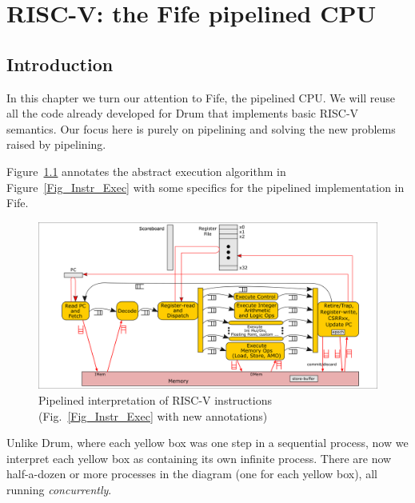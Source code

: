 

\chapter{RISC-V: the Fife pipelined CPU}


\setcounter{page}{1}
\renewcommand{\thepage}{\arabic{chapter}-\arabic{page}}

\label{ch_Fife_Pending}


\section{Introduction}

In this chapter we turn our attention to Fife, the pipelined CPU.  We
will reuse all the code already developed for Drum that implements
basic RISC-V semantics.  Our focus here is purely on pipelining and
solving the new problems raised by pipelining.

Figure~\ref{Fig_Instr_Exec_w_FIFOs} annotates the abstract execution
algorithm in Figure~\ref{Fig_Instr_Exec} with some specifics for the
pipelined implementation in Fife.
\begin{figure}[htbp]
  \centerline{\includegraphics[width=6in,angle=0]{Figures/Fig_Instr_Exec_w_FIFOs}}
  \caption{\label{Fig_Instr_Exec_w_FIFOs}Pipelined interpretation of RISC-V instructions (Fig.~\ref{Fig_Instr_Exec} with new annotations)}
\end{figure}
Unlike Drum, where each yellow box was one step in a sequential
process, now we interpret each yellow box as containing its own
infinite process.  There are now half-a-dozen or more processes in the
diagram (one for each yellow box), all running \emph{concurrently}.

